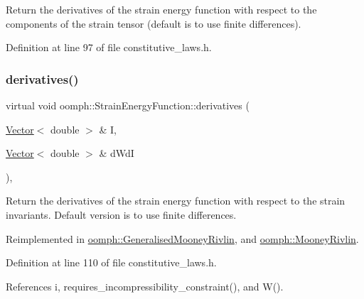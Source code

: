 Return the derivatives of the strain energy function with respect to the components of the strain tensor (default is to use finite differences). 



Definition at line 97 of file constitutive\+\_\+laws.\+h.

\mbox{\label{classoomph_1_1StrainEnergyFunction_a81ca7bb14cce217ffac9d308dba39756}} 
\subsubsection{\texorpdfstring{derivatives()}{derivatives()}}
{\footnotesize\ttfamily virtual void oomph\+::\+Strain\+Energy\+Function\+::derivatives (\begin{DoxyParamCaption}\item[{\hyperlink{classoomph_1_1Vector}{Vector}$<$ double $>$ \&}]{I,  }\item[{\hyperlink{classoomph_1_1Vector}{Vector}$<$ double $>$ \&}]{d\+WdI }\end{DoxyParamCaption})\hspace{0.3cm}{\ttfamily [inline]}, {\ttfamily [virtual]}}



Return the derivatives of the strain energy function with respect to the strain invariants. Default version is to use finite differences. 



Reimplemented in \hyperlink{classoomph_1_1GeneralisedMooneyRivlin_aa0ca6d085deb4758119ff68222a27a8b}{oomph\+::\+Generalised\+Mooney\+Rivlin}, and \hyperlink{classoomph_1_1MooneyRivlin_a01ff4e87c76813d6a9e528bd896a2bae}{oomph\+::\+Mooney\+Rivlin}.



Definition at line 110 of file constitutive\+\_\+laws.\+h.



References i, requires\+\_\+incompressibility\+\_\+constraint(), and W().

\mbox{\label{classoomph_1_1StrainEnergyFunction_a312fe03c070f5c45a99ae4e186936147}} 
